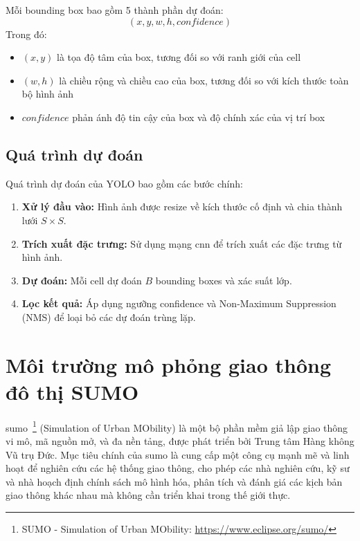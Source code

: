 Mỗi bounding box bao gồm 5 thành phần dự đoán:
\begin{equation}
    (x, y, w, h, confidence)
\end{equation}
Trong đó:
\begin{itemize}
    \item $(x, y)$ là tọa độ tâm của box, tương đối so với ranh giới của cell

    \item $(w, h)$ là chiều rộng và chiều cao của box, tương đối so với kích
        thước toàn bộ hình ảnh

    \item $confidence$ phản ánh độ tin cậy của box và độ chính xác của vị trí box
\end{itemize}

\subsection{Quá trình dự đoán}
Quá trình dự đoán của YOLO bao gồm các bước chính:
\begin{enumerate}
    \item \textbf{Xử lý đầu vào:} Hình ảnh được resize về kích thước cố định và
        chia thành lưới $S \times S$.

    \item \textbf{Trích xuất đặc trưng:} Sử dụng mạng \ac{cnn} để trích xuất các
        đặc trưng từ hình ảnh.

    \item \textbf{Dự đoán:} Mỗi cell dự đoán $B$ bounding boxes và xác suất lớp.

    \item \textbf{Lọc kết quả:} Áp dụng ngưỡng confidence và Non-Maximum
        Suppression (NMS) để loại bỏ các dự đoán trùng lặp.
\end{enumerate}

\section{Môi trường mô phỏng giao thông đô thị SUMO}
\ac{sumo}~\footnote{SUMO - Simulation of Urban MObility: \url{https://www.eclipse.org/sumo/}} (Simulation of Urban MObility) là một bộ phần mềm giả lập giao thông vi
mô, mã nguồn mở, và đa nền tảng, được phát triển bởi Trung tâm Hàng không Vũ trụ
Đức. Mục tiêu chính của \ac{sumo} là cung cấp một công cụ mạnh mẽ và linh hoạt
để nghiên cứu các hệ thống giao thông, cho phép các nhà nghiên cứu, kỹ sư và nhà
hoạch định chính sách mô hình hóa, phân tích và đánh giá các kịch bản giao thông
khác nhau mà không cần triển khai trong thế giới thực.


